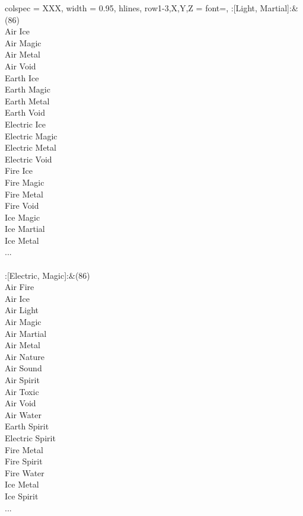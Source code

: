 \begin{longtblr}[
	caption = {2v2 Defending Weak},
	label = {2v2-Defending-Weak},
]{
	colspec = {XXX}, width = 0.95\linewidth,
	hlines,
	row{1-3,X,Y,Z} = {font=\bfseries},
}
	:[Light, Martial]:&{(86)\\
	Air Ice \\
	Air Magic \\
	Air Metal \\
	Air Void \\
	Earth Ice \\
	Earth Magic \\
	Earth Metal \\
	Earth Void \\
	Electric Ice \\
	Electric Magic \\
	Electric Metal \\
	Electric Void \\
	Fire Ice \\
	Fire Magic \\
	Fire Metal \\
	Fire Void \\
	Ice Magic \\
	Ice Martial \\
	Ice Metal \\
	...\\
	}\\

	:[Electric, Magic]:&{(86)\\
	Air Fire \\
	Air Ice \\
	Air Light \\
	Air Magic \\
	Air Martial \\
	Air Metal \\
	Air Nature \\
	Air Sound \\
	Air Spirit \\
	Air Toxic \\
	Air Void \\
	Air Water \\
	Earth Spirit \\
	Electric Spirit \\
	Fire Metal \\
	Fire Spirit \\
	Fire Water \\
	Ice Metal \\
	Ice Spirit \\
	...\\
	}\\


\end{longtblr}
